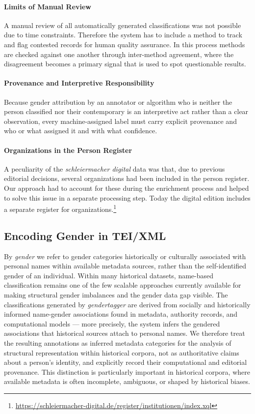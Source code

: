 \documentclass{eceasst}
\begin{document}
\paragraph{Limits of Manual Review} A manual review of all automatically generated classifications was not possible due to time constraints. Therefore the system has to include a method to track and flag contested records for human quality assurance. In this process methods are checked against one another through inter-method agreement, where the disagreement becomes a primary signal that is used to spot questionable results.

\paragraph{Provenance and Interpretive Responsibility} Because gender attribution by an annotator or algorithm who is neither the person classified nor their contemporary is an interpretive act rather than a clear observation, every machine-assigned label must carry explicit provenance and who or what assigned it and with what confidence.

\paragraph{Organizations in the Person Register} A peculiarity of the \textit{schleiermacher digital} data was that, due to previous editorial decisions, several organizations had been included in the person register. Our approach had to account for these during the enrichment process and helped to solve this issue in a separate processing step. Today the digital edition includes a separate register for organizations.\footnote{\url{https://schleiermacher-digital.de/register/institutionen/index.xql}}

\subsection{Encoding Gender in TEI/XML}
\label{sec:tei-encoding}

By \textit{gender} we refer to gender categories historically or culturally associated with personal names within available metadata sources, rather than the self-identified gender of an individual. Within many historical datasets, name-based classification remains one of the few scalable approaches currently available for making structural gender imbalances and the gender data gap visible. The classifications generated by \textit{gendertagger} are derived from socially and historically informed name-gender associations \cite{buskirk_open-source_2023} found in metadata, authority records, and computational models — more precisely, the system infers the gendered associations that historical sources attach to personal names. We therefore treat the resulting annotations as inferred metadata categories for the analysis of structural representation within historical corpora, not as authoritative claims about a person's identity, and explicitly record their computational and editorial provenance. This distinction is particularly important in historical corpora, where available metadata is often incomplete, ambiguous, or shaped by historical biases.
\end{document}

